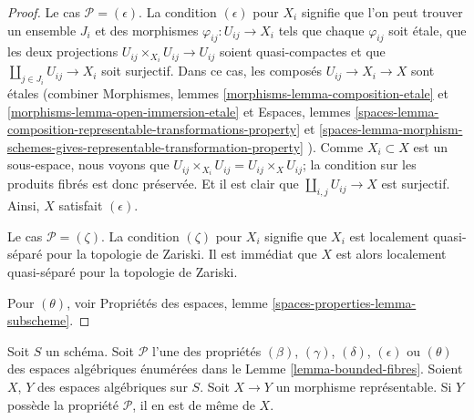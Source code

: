 \begin{proof}
\medskip\noindent
Le cas $\mathcal{P} = (\epsilon)$. La condition $(\epsilon)$ pour $X_i$
signifie que l'on peut trouver un ensemble $J_i$ et des morphismes
$\varphi_{ij} : U_{ij} \to X_i$ tels que chaque $\varphi_{ij}$ soit étale,
que les deux projections $U_{ij} \times_{X_i} U_{ij} \to U_{ij}$ soient
quasi-compactes et que $\coprod_{j \in J_i} U_{ij} \to X_i$ soit surjectif.
Dans ce cas, les composés $U_{ij} \to X_i \to X$ sont étales
(combiner
Morphismes, lemmes
\ref{morphisms-lemma-composition-etale} et
\ref{morphisms-lemma-open-immersion-etale}
et
Espaces, lemmes
\ref{spaces-lemma-composition-representable-transformations-property} et
\ref{spaces-lemma-morphism-schemes-gives-representable-transformation-property}
).
Comme $X_i \subset X$ est un sous-espace, nous voyons que
$U_{ij} \times_{X_i} U_{ij} = U_{ij} \times_X U_{ij}$; la condition sur
les produits fibrés est donc préservée. Et il est clair que
$\coprod_{i, j} U_{ij} \to X$ est surjectif. Ainsi, $X$
satisfait $(\epsilon)$.

\medskip\noindent
Le cas $\mathcal{P} = (\zeta)$. La condition $(\zeta)$ pour $X_i$ signifie
que $X_i$ est localement quasi-séparé pour la topologie de Zariski.
Il est immédiat que $X$ est alors localement quasi-séparé pour la
topologie de Zariski.

\medskip\noindent
Pour $(\theta)$, voir
Propriétés des espaces,
lemme \ref{spaces-properties-lemma-subscheme}.
\end{proof}

\begin{lemma}
\label{lemma-representable-properties}
Soit $S$ un schéma. Soit $\mathcal{P}$ l'une des propriétés
$(\beta)$, $(\gamma)$, $(\delta)$, $(\epsilon)$ ou
$(\theta)$ des espaces algébriques énumérées dans le
Lemme \ref{lemma-bounded-fibres}.
Soient $X$, $Y$ des espaces algébriques sur $S$.
Soit $X \to Y$ un morphisme représentable.
Si $Y$ possède la propriété $\mathcal{P}$, il en est de même de $X$.
\end{lemma}

